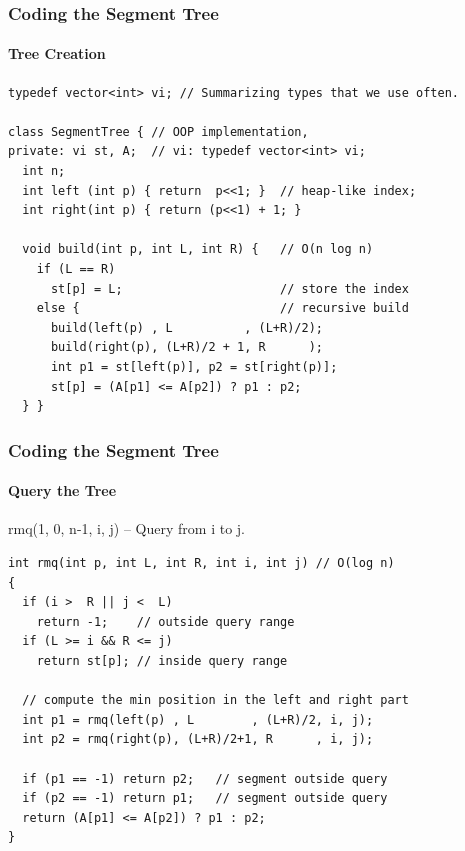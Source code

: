 \begin{frame}[fragile]
  \frametitle{Coding the Segment Tree}
  \framesubtitle{Tree Creation}
{\smaller
\begin{block}{}
\begin{verbatim}
typedef vector<int> vi; // Summarizing types that we use often.

class SegmentTree { // OOP implementation,
private: vi st, A;  // vi: typedef vector<int> vi;
  int n;
  int left (int p) { return  p<<1; }  // heap-like index;
  int right(int p) { return (p<<1) + 1; }

  void build(int p, int L, int R) {   // O(n log n)
    if (L == R)
      st[p] = L;                      // store the index
    else {                            // recursive build
      build(left(p) , L          , (L+R)/2);
      build(right(p), (L+R)/2 + 1, R      );
      int p1 = st[left(p)], p2 = st[right(p)];
      st[p] = (A[p1] <= A[p2]) ? p1 : p2;
  } }
\end{verbatim}
\end{block}}

\end{frame}

\begin{frame}[fragile]
  \frametitle{Coding the Segment Tree}
  \framesubtitle{Query the Tree}
{\smaller
\begin{block}{rmq(1, 0, n-1, i, j) -- Query from i to j.}
\begin{verbatim}
int rmq(int p, int L, int R, int i, int j) // O(log n)
{
  if (i >  R || j <  L)
    return -1;    // outside query range
  if (L >= i && R <= j)
    return st[p]; // inside query range

  // compute the min position in the left and right part
  int p1 = rmq(left(p) , L        , (L+R)/2, i, j);
  int p2 = rmq(right(p), (L+R)/2+1, R      , i, j);

  if (p1 == -1) return p2;   // segment outside query
  if (p2 == -1) return p1;   // segment outside query
  return (A[p1] <= A[p2]) ? p1 : p2;
}
\end{verbatim}
\end{block}}
\end{frame}

